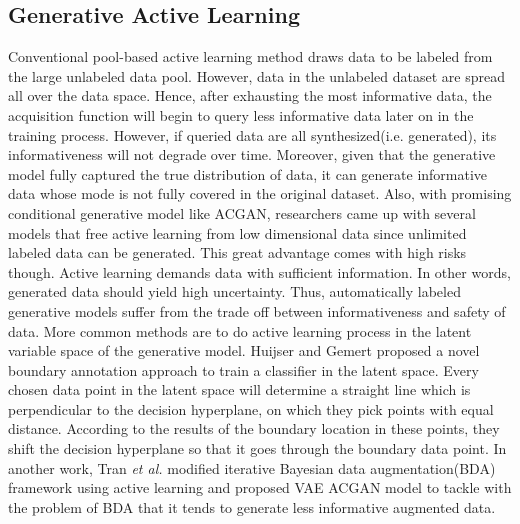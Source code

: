 \documentclass[10pt,twocolumn,letterpaper]{article}
\begin{document}
\subsection{Generative Active Learning}
Conventional pool-based active learning method draws data to be labeled from the large unlabeled data pool. However, data in the unlabeled dataset are spread all over the data space. Hence, after exhausting the most informative data, the acquisition function will begin to query less informative data later on in the training process. However, if queried data are all synthesized(i.e. generated), its informativeness will not degrade over time. Moreover, given that the generative model fully captured the true distribution of data, it can generate informative data whose mode is not fully covered in the original dataset\cite{Zhu2017GenerativeAA}. Also, with promising conditional generative model like ACGAN, researchers came up with several models that free active learning from low dimensional data since unlimited labeled data can be generated\cite{kong2019active}. This great advantage comes with high risks though. Active learning demands data with sufficient information. In other words, generated data should yield high uncertainty. Thus, automatically labeled generative models suffer from the trade off between informativeness and safety of data. More common methods are to do active learning process in the latent variable space of the generative model. Huijser and Gemert proposed a novel boundary annotation approach to train a classifier in the latent space\cite{huijser2017active}. Every chosen data point in the latent space will determine a straight line which is perpendicular to the decision hyperplane, on which they pick points with equal distance. According to the results of the boundary location in these points, they shift the decision hyperplane so that it goes through the boundary data point. In another work, Tran \emph{et al.} modified iterative Bayesian data augmentation(BDA) framework using active learning and proposed VAE ACGAN model to tackle with the problem of BDA that it tends to generate less informative augmented data\cite{tran2019bayesian}.

  
\end{document}
